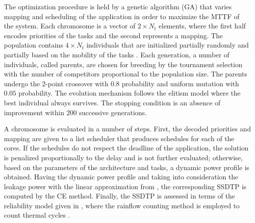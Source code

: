 The optimization procedure is held by a genetic algorithm (GA) \cite{schmitz2004} that varies mapping and scheduling of the application in order to maximize the MTTF of the system. Each chromosome is a vector of $2 \times N_t$ elements, where the first half encodes priorities of the tasks and the second represents a mapping. The population contains $4 \times N_t$ individuals that are initialized partially randomly and partially based on the mobility of the tasks \cite{schmitz2004}. Each generation, a number of individuals, called parents, are chosen for breeding by the tournament selection with the number of competitors proportional to the population size. The parents undergo the 2-point crossover with $0.8$ probability and uniform mutation with $0.05$ probability. The evolution mechanism follows the elitism model where the best individual always survives. The stopping condition is an absence of improvement within $200$ successive generations.

A chromosome is evaluated in a number of steps. First, the decoded priorities and mapping are given to a list scheduler that produces schedules for each of the cores. If the schedules do not respect the deadline of the application, the solution is penalized proportionally to the delay and is not further evaluated; otherwise, based on the parameters of the architecture and tasks, a dynamic power profile is obtained. Having the dynamic power profile and taking into consideration the leakage power with the linear approximation from , the corresponding SSDTP is computed by the CE method. Finally, the SSDTP is assessed in terms of the reliability model given in , where the rainflow counting method is employed to count thermal cycles \cite{xiang2010}.
